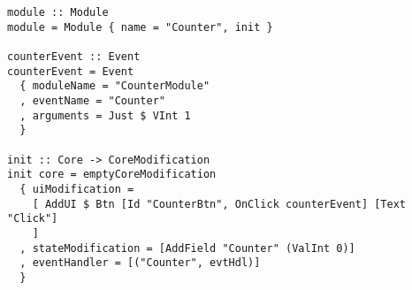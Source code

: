 \begin{verbatim}
module :: Module
module = Module { name = "Counter", init }

counterEvent :: Event
counterEvent = Event
  { moduleName = "CounterModule"
  , eventName = "Counter"
  , arguments = Just $ VInt 1
  }

init :: Core -> CoreModification
init core = emptyCoreModification
  { uiModification =
    [ AddUI $ Btn [Id "CounterBtn", OnClick counterEvent] [Text "Click"]
    ]
  , stateModification = [AddField "Counter" (ValInt 0)]
  , eventHandler = [("Counter", evtHdl)]
  }
\end{verbatim}
